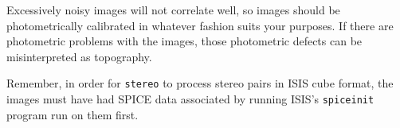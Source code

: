 Excessively noisy images will not correlate well, so images should be
photometrically calibrated in whatever fashion suits your purposes. If
there are photometric problems with the images, those photometric
defects can be misinterpreted as topography.

Remember, in order for \texttt{stereo} to process stereo pairs in
\ac{ISIS} cube format, the images must have had SPICE data associated
by running ISIS's \texttt{spiceinit} program run on them first.





